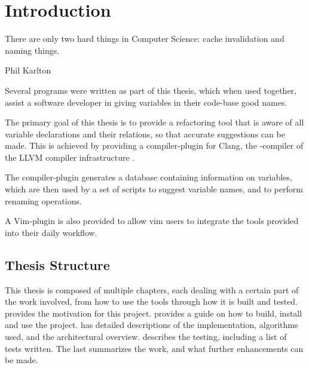 \chapter{Introduction}
\label{chap:Introduction}

\epigraph{There are only two hard things in Computer Science: cache invalidation
	and naming things.}{Phil Karlton}

Several programs were written as part of this thesis, which when used together,
assist a software developer in giving variables in their \CC{} code-base good
names.

The primary goal of this thesis is to provide a refactoring tool that is aware
of all variable declarations and their relations, so that accurate suggestions
can be made. This is achieved by providing a compiler-plugin for Clang, the
\CC{}-compiler of the LLVM compiler infrastructure \cite{llvm}.

The compiler-plugin generates a database containing information on variables,
which are then used by a set of scripts to suggest variable names, and to
perform renaming operations.

A Vim-plugin is also provided to allow vim users to integrate the tools provided
into their daily workflow.

\section{Thesis Structure}
This thesis is composed of multiple chapters, each dealing with a certain part
of the work involved, from how to use the tools through how it is built and
tested.
 provides the motivation for this project.
 provides a guide on how to build, install and use the
project.
 has detailed descriptions of the implementation,
algorithms used, and the architectural overview.
 describes the testing, including a list of tests written.
The last  summarizes the work, and what further enhancements
can be made.
